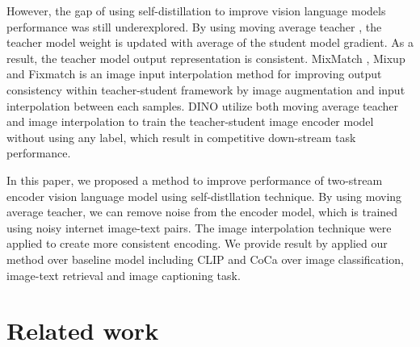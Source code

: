 \documentclass[10pt,twocolumn,letterpaper]{article}
\begin{document}
However, the gap of using self-distillation to improve vision language models performance was still underexplored. 
By using moving average teacher \cite{mean_teacher,eman}, the teacher model weight is updated with average of the student model gradient. 
As a result, the teacher model output representation is consistent.
MixMatch \cite{mixmatch}, Mixup \cite{mixup} and Fixmatch \cite{fixmatch} is an image input interpolation method for improving output consistency within teacher-student framework by image augmentation and input interpolation between each samples.
DINO \cite{dino} utilize both moving average teacher and image interpolation to train the teacher-student image encoder model without using any label, which result in competitive down-stream task performance.

In this paper, we proposed a method to improve performance of two-stream encoder vision language model using self-distllation technique.
By using moving average teacher, we can remove noise from the encoder model, which is trained using noisy internet image-text pairs.
The image interpolation technique were applied to create more consistent encoding.
We provide result by applied our method over baseline model including CLIP and CoCa over image classification, image-text retrieval and image captioning task.




\section{Related work}
\end{document}
